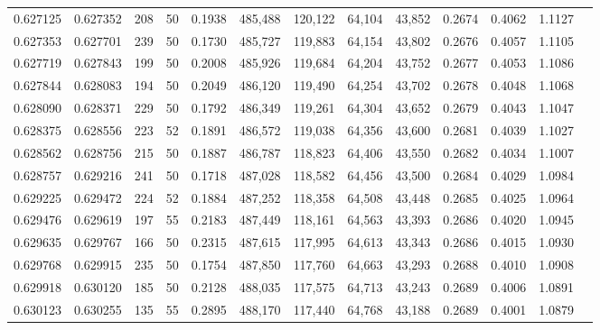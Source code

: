 \begin{tabular}{rrrrrrrrrrrrr}
0.627125 & 0.627352 &   208 &  50 &                                     0.1938 & 485,488 & 120,122 &  64,104 &  43,852 & 0.2674 & 0.4062 & 1.1127 \\
0.627353 & 0.627701 &   239 &  50 &                                     0.1730 & 485,727 & 119,883 &  64,154 &  43,802 & 0.2676 & 0.4057 & 1.1105 \\
0.627719 & 0.627843 &   199 &  50 &                                     0.2008 & 485,926 & 119,684 &  64,204 &  43,752 & 0.2677 & 0.4053 & 1.1086 \\
0.627844 & 0.628083 &   194 &  50 &                                     0.2049 & 486,120 & 119,490 &  64,254 &  43,702 & 0.2678 & 0.4048 & 1.1068 \\
0.628090 & 0.628371 &   229 &  50 &                                     0.1792 & 486,349 & 119,261 &  64,304 &  43,652 & 0.2679 & 0.4043 & 1.1047 \\
0.628375 & 0.628556 &   223 &  52 &                                     0.1891 & 486,572 & 119,038 &  64,356 &  43,600 & 0.2681 & 0.4039 & 1.1027 \\
0.628562 & 0.628756 &   215 &  50 &                                     0.1887 & 486,787 & 118,823 &  64,406 &  43,550 & 0.2682 & 0.4034 & 1.1007 \\
0.628757 & 0.629216 &   241 &  50 &                                     0.1718 & 487,028 & 118,582 &  64,456 &  43,500 & 0.2684 & 0.4029 & 1.0984 \\
0.629225 & 0.629472 &   224 &  52 &                                     0.1884 & 487,252 & 118,358 &  64,508 &  43,448 & 0.2685 & 0.4025 & 1.0964 \\
0.629476 & 0.629619 &   197 &  55 &                                     0.2183 & 487,449 & 118,161 &  64,563 &  43,393 & 0.2686 & 0.4020 & 1.0945 \\
0.629635 & 0.629767 &   166 &  50 &                                     0.2315 & 487,615 & 117,995 &  64,613 &  43,343 & 0.2686 & 0.4015 & 1.0930 \\
0.629768 & 0.629915 &   235 &  50 &                                     0.1754 & 487,850 & 117,760 &  64,663 &  43,293 & 0.2688 & 0.4010 & 1.0908 \\
0.629918 & 0.630120 &   185 &  50 &                                     0.2128 & 488,035 & 117,575 &  64,713 &  43,243 & 0.2689 & 0.4006 & 1.0891 \\
0.630123 & 0.630255 &   135 &  55 &                                     0.2895 & 488,170 & 117,440 &  64,768 &  43,188 & 0.2689 & 0.4001 & 1.0879 \\

\end{tabular}
